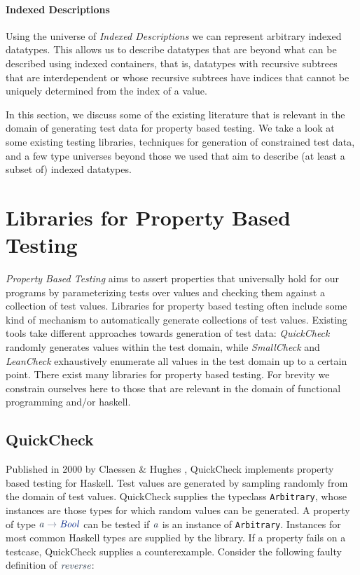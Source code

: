 \documentclass[a4paper,msc,twosized=semi]{uustthesis}
\newcommand*{\mathcolor}{}
\def\mathcolor#1#{\mathcoloraux{#1}}
\newcommand*{\mathcoloraux}[3]{%
  \protect\leavevmode
  \begingroup
    \color#1{#2}#3%
  \endgroup
}
\newcommand{\HSSym}[1]{\mathcolor{hsblue4}{#1}}
\newcommand{\HSCon}[1]{\mathcolor{hsblue3}{\mathit{#1}}}
\newcommand{\HSVar}[1]{\mathcolor{hsblue5}{\mathit{#1}}}
\begin{document}
  \paragraph{Indexed Descriptions}
    Using the universe of \emph{Indexed Descriptions} \cite{dagand2013cosmology}
    we can represent arbitrary indexed datatypes. This allows us to describe 
    datatypes that are beyond what can be described using indexed containers, 
    that is, datatypes with recursive subtrees that are interdependent or whose 
    recursive subtrees have indices that cannot be uniquely determined from the 
    index of a value. 

    In this section, we discuss some of the existing literature that is relevant in the 
domain of generating test data for property based testing. We take a look at some 
existing testing libraries, techniques for generation of constrained test data, and a 
few type universes beyond those we used that aim to describe (at least a subset of) 
indexed datatypes. 

\section{Libraries for Property Based Testing}

  \textit{Property Based Testing} aims to assert properties that universally hold for 
  our programs by parameterizing tests over values and checking them against a 
  collection of test values. Libraries for property based testing often include some 
  kind of mechanism to automatically generate collections of test values. Existing 
  tools take different approaches towards generation of test data: \textit{QuickCheck} 
  \cite{claessen2011quickcheck} randomly generates values within the test domain, 
  while \textit{SmallCheck} \cite{runciman2008smallcheck} and \textit{LeanCheck} \cite
  {matela2017tools} exhaustively enumerate all values in the test domain up to a 
  certain point. There exist many libraries for property based testing. For brevity we 
  constrain ourselves here to those that are relevant in the domain of functional 
  programming and/or haskell. 

\subsection{QuickCheck} 

  Published in 2000 by Claessen \& Hughes \cite{claessen2011quickcheck}, QuickCheck 
  implements property based testing for Haskell. Test values are generated by sampling randomly from the domain of test values. QuickCheck supplies 
  the typeclass \texttt{Arbitrary}, whose instances are those types for which random 
  values can be generated. A property of type \ensuremath{\HSVar{a}\HSSym{\to} \HSCon{Bool}} can be tested if \ensuremath{\HSVar{a}} is an 
  instance of \texttt{Arbitrary}. Instances for most common Haskell types are supplied 
  by the library. If a property fails on a testcase, QuickCheck supplies a 
  counterexample. Consider the following faulty definition of \ensuremath{\HSVar{reverse}}: 
\end{document}
